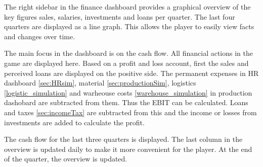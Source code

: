 The right sidebar in the finance dashboard provides a graphical overview of the key figures sales, salaries, investments and loans per quarter. The last four quarters are displayed as a line graph. This allows the player to easily view facts and changes over time. 

The main focus in the dashboard is on the cash flow. All financial actions in the game are displayed here. Based on a profit and loss account, first the sales and perceived loans are displayed on the positive side. The permanent expenses in HR dashboard \ref{sec:HRsim}, material \ref{sec:productionSim}, logistics \ref{logistic_simulation} and warheouse costs \ref{warehouse_simulation} in production dashobard are subtracted from them. Thus the EBIT can be calculated. Loans and taxes \ref{sec:incomeTax} are subtracted from this and the income or losses from investments are added to calculate the profit.

The cash flow for the last three quarters is displayed. The last column in the overview is updated daily to make it more convenient for the player. At the end of the quarter, the overview is updated. 
